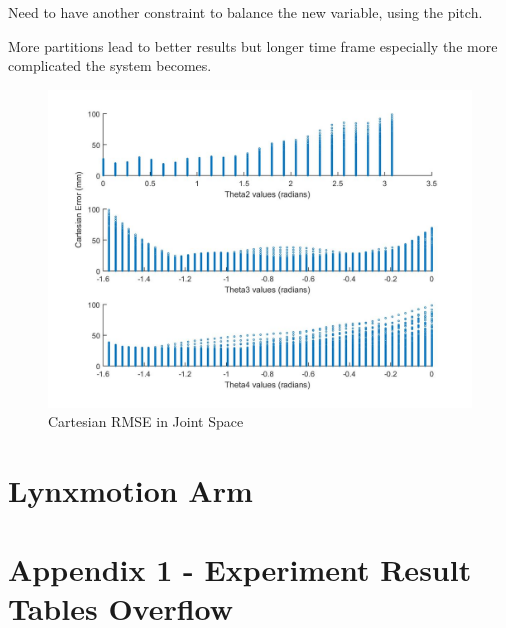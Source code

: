 \documentclass[11.5pt, twoside, a4paper]{article}
\begin{document}
Need to have another constraint to balance the new variable, using the pitch.

More partitions lead to better results but longer time frame especially the more complicated the system becomes.

\begin{figure}
\includegraphics[width=\linewidth]{cartesianerrorsTHETA.jpg}
\caption{Cartesian RMSE in Joint Space\label{fig:carterrors}}
\end{figure}


\section{Lynxmotion Arm}




































\section{Appendix 1 - Experiment Result Tables Overflow}
\end{document}
